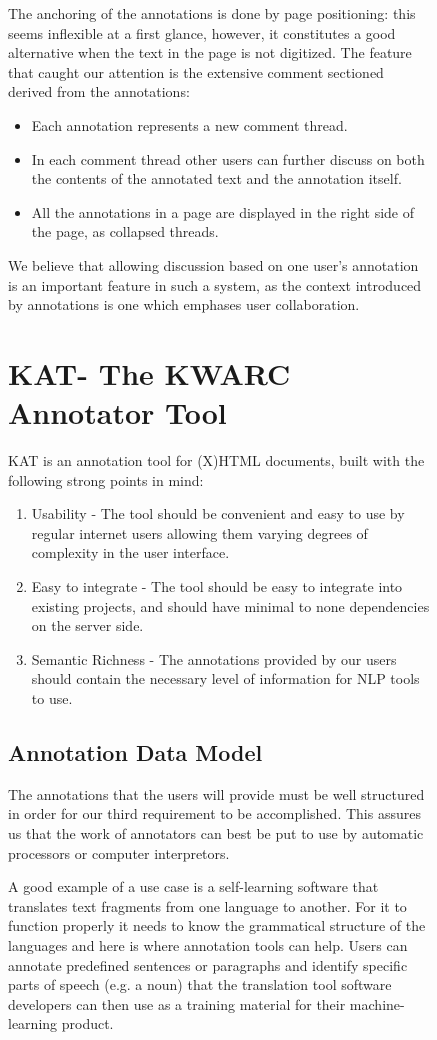 \documentclass[a4paper, 12pt, notitlepage]{report}
\def\KAT{\textsf{KAT}\xspace}
\begin{document}
\begin{figure}[ht]
The anchoring of the annotations is done by page positioning: this seems inflexible at a
first glance, however, it constitutes a good alternative when the text in the page is not
digitized.  The feature that caught our attention is the extensive comment sectioned
derived from the annotations:
\begin{itemize}
\item Each annotation represents a new comment thread.
\item In each comment thread other users can further discuss on both the contents of the
  annotated text and the annotation itself.
\item All the annotations in a page are displayed in the right side of the page, as
  collapsed threads.
\end{itemize}
We believe that allowing discussion based on one user's annotation is an important feature in such a system, as the context introduced by annotations is one which emphases user collaboration.


\chapter{\KAT - The KWARC Annotator Tool}
\KAT is an annotation tool for (X)HTML documents, built with the following strong points
in mind:
\begin{enumerate}
\item Usability - The tool should be convenient and easy to use by regular internet users
  allowing them varying degrees of complexity in the user interface.
\item Easy to integrate - The tool should be easy to integrate into existing projects, and
  should have minimal to none dependencies on the server side.
\item Semantic Richness - The annotations provided by our users should contain the
  necessary level of information for NLP tools to use.
\end{enumerate}
\section{Annotation Data Model}
The annotations that the users will provide must be well structured in order for our third
requirement to be accomplished. This assures us that the work of annotators can best be
put to use by automatic processors or computer interpretors.

A good example of a use case is a self-learning software that translates text fragments
from one language to another.  For it to function properly it needs to know the
grammatical structure of the languages and here is where annotation tools can help.  Users
can annotate predefined sentences or paragraphs and identify specific parts of speech
(e.g. a noun) that the translation tool software developers can then use as a training
material for their machine-learning product.


\end{figure}
\end{document}
